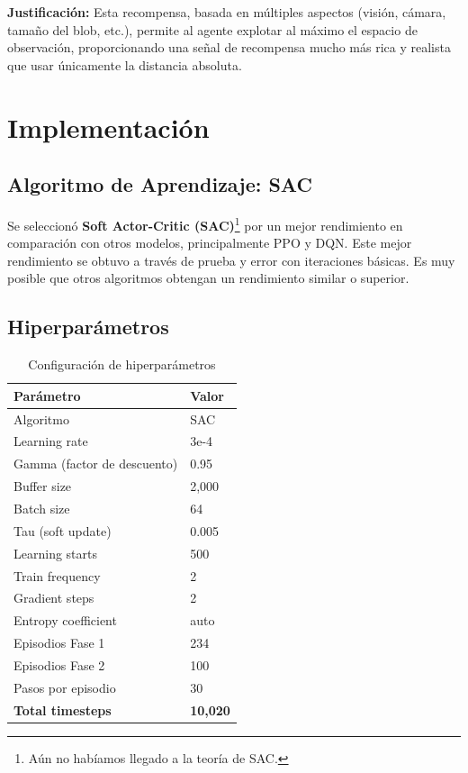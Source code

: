 \documentclass[12pt,a4paper]{article}
\begin{document}
\textbf{Justificación:} Esta recompensa, basada en múltiples aspectos (visión, cámara, tamaño del blob, etc.), permite al agente explotar al máximo el espacio de observación, proporcionando una señal de recompensa mucho más rica y realista que usar únicamente la distancia absoluta.

\section{Implementación}

\subsection{Algoritmo de Aprendizaje: SAC}

Se seleccionó \textbf{Soft Actor-Critic (SAC)}\footnote{Aún no habíamos llegado a la teoría de SAC.} por un mejor rendimiento en comparación con otros modelos, principalmente PPO y DQN. Este mejor rendimiento se obtuvo a través de prueba y error con iteraciones básicas. Es muy posible que otros algoritmos obtengan un rendimiento similar o superior.

\subsection{Hiperparámetros}

\begin{table}[H]
\centering
\begin{tabular}{@{}ll@{}}
\toprule
\textbf{Parámetro} & \textbf{Valor} \\ \midrule
Algoritmo & SAC \\
Learning rate & 3e-4 \\
Gamma (factor de descuento) & 0.95 \\
Buffer size & 2,000 \\
Batch size & 64 \\
Tau (soft update) & 0.005 \\
Learning starts & 500 \\
Train frequency & 2 \\
Gradient steps & 2 \\
Entropy coefficient & auto \\
Episodios Fase 1 & 234 \\
Episodios Fase 2 & 100 \\
Pasos por episodio & 30 \\
\textbf{Total timesteps} & \textbf{10,020} \\ \bottomrule
\end{tabular}
\caption{Configuración de hiperparámetros}
\end{table}
\end{document}
